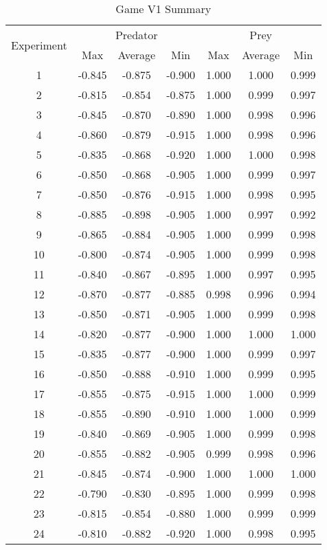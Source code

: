 \begin{table}
  \centering
  \begin{tabular}{|c|c|c|c|c|c|c|}
    \hline
    \multirow{2}{*}{Experiment} & \multicolumn{3}{|c|}{Predator} & \multicolumn{3}{|c|}{Prey} \\\cline{2-7}
    & Max & Average & Min & Max & Average & Min\\
    \hline
    1 & -0.845 & -0.875 & -0.900 & 1.000 & 1.000 & 0.999 \\
2 & -0.815 & -0.854 & -0.875 & 1.000 & 0.999 & 0.997 \\
3 & -0.845 & -0.870 & -0.890 & 1.000 & 0.998 & 0.996 \\
4 & -0.860 & -0.879 & -0.915 & 1.000 & 0.998 & 0.996 \\
5 & -0.835 & -0.868 & -0.920 & 1.000 & 1.000 & 0.998 \\
6 & -0.850 & -0.868 & -0.905 & 1.000 & 0.999 & 0.997 \\
7 & -0.850 & -0.876 & -0.915 & 1.000 & 0.998 & 0.995 \\
8 & -0.885 & -0.898 & -0.905 & 1.000 & 0.997 & 0.992 \\
9 & -0.865 & -0.884 & -0.905 & 1.000 & 0.999 & 0.998 \\
10 & -0.800 & -0.874 & -0.905 & 1.000 & 0.999 & 0.998 \\
11 & -0.840 & -0.867 & -0.895 & 1.000 & 0.997 & 0.995 \\
12 & -0.870 & -0.877 & -0.885 & 0.998 & 0.996 & 0.994 \\
13 & -0.850 & -0.871 & -0.905 & 1.000 & 0.999 & 0.998 \\
14 & -0.820 & -0.877 & -0.900 & 1.000 & 1.000 & 1.000 \\
15 & -0.835 & -0.877 & -0.900 & 1.000 & 0.999 & 0.997 \\
16 & -0.850 & -0.888 & -0.910 & 1.000 & 0.999 & 0.995 \\
17 & -0.855 & -0.875 & -0.915 & 1.000 & 1.000 & 0.999 \\
18 & -0.855 & -0.890 & -0.910 & 1.000 & 1.000 & 0.999 \\
19 & -0.840 & -0.869 & -0.905 & 1.000 & 0.999 & 0.998 \\
20 & -0.855 & -0.882 & -0.905 & 0.999 & 0.998 & 0.996 \\
21 & -0.845 & -0.874 & -0.900 & 1.000 & 1.000 & 1.000 \\
22 & -0.790 & -0.830 & -0.895 & 1.000 & 0.999 & 0.998 \\
23 & -0.815 & -0.854 & -0.880 & 1.000 & 0.999 & 0.999 \\
24 & -0.810 & -0.882 & -0.920 & 1.000 & 0.998 & 0.995\\
\hline
  \end{tabular}
  \caption{Game V1 Summary }
  \label{tab:v1-summary}
\end{table}



